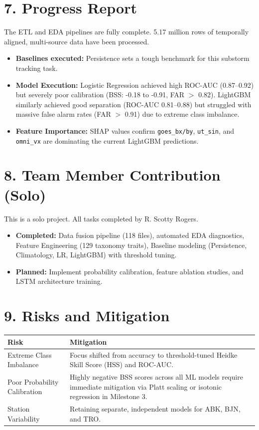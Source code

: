 \documentclass{article}
\begin{document}
\section*{7. Progress Report}
The ETL and EDA pipelines are fully complete. 5.17 million rows of temporally aligned, multi-source data have been processed.
\begin{itemize}
    \item \textbf{Baselines executed:} Persistence sets a tough benchmark for this substorm tracking task. 
    \item \textbf{Model Execution:} Logistic Regression achieved high ROC-AUC (0.87--0.92) but severely poor calibration (BSS: -0.18 to -0.91, FAR $>$ 0.82). LightGBM similarly achieved good separation (ROC-AUC 0.81--0.88) but struggled with massive false alarm rates (FAR $>$ 0.91) due to extreme class imbalance. 
    \item \textbf{Feature Importance:} SHAP values confirm \texttt{goes\_bx/by}, \texttt{ut\_sin}, and \texttt{omni\_vx} are dominating the current LightGBM predictions.
\end{itemize}

\section*{8. Team Member Contribution (Solo)}
This is a solo project. All tasks completed by R. Scotty Rogers.
\begin{itemize}[noitemsep]
    \item \textbf{Completed:} Data fusion pipeline (118 files), automated EDA diagnostics, Feature Engineering (129 taxonomy traits), Baseline modeling (Persistence, Climatology, LR, LightGBM) with threshold tuning.
    \item \textbf{Planned:} Implement probability calibration, feature ablation studies, and LSTM architecture training.
\end{itemize}

\section*{9. Risks and Mitigation}
\begin{table}[H]
\centering
\begin{tabular}{p{4.5cm}p{10cm}}
\toprule
\textbf{Risk} & \textbf{Mitigation} \\
\midrule
Extreme Class Imbalance & Focus shifted from accuracy to threshold-tuned Heidke Skill Score (HSS) and ROC-AUC. \\
Poor Probability Calibration & Highly negative BSS scores across all ML models require immediate mitigation via Platt scaling or isotonic regression in Milestone 3. \\
Station Variability & Retaining separate, independent models for ABK, BJN, and TRO. \\
\bottomrule
\end{tabular}
\end{table}
\end{document}
